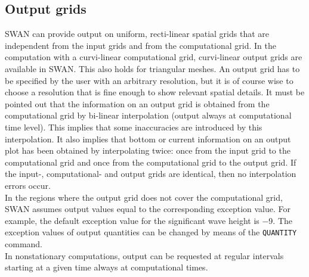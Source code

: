 \documentclass[12pt]{book}
\begin{document}
\subsection{Output grids}
SWAN can provide output on uniform, recti-linear spatial grids that are independent from the input grids
and from the computational grid. In the computation with a curvi-linear computational grid, curvi-linear
output grids are available in SWAN. This also holds for triangular meshes.
An output grid has to be specified by the user with an arbitrary
resolution, but it is of course wise to choose a resolution that is fine enough to show relevant spatial
details. It must be pointed out that the information on an output grid is obtained from the computational
grid by bi-linear interpolation (output always at computational time level). This implies that some
inaccuracies are introduced by this interpolation. It also implies that bottom or current information on an
output plot has been obtained by interpolating twice: once from the input grid to the computational grid
and once from the computational grid to the output grid. If the input-, computational- and output grids are
identical, then no interpolation errors occur.
\\[2ex]
\noindent
In the regions where the output grid does not cover the computational grid, SWAN assumes output values
equal to the corresponding exception value. For example, the default exception value for the significant
wave height is $-$9. The exception values of output quantities can be changed by means of the {\tt QUANTITY}
command.
\\[2ex]
\noindent
In nonstationary computations, output can be requested at regular intervals starting at a given time
always at computational times.
\end{document}
